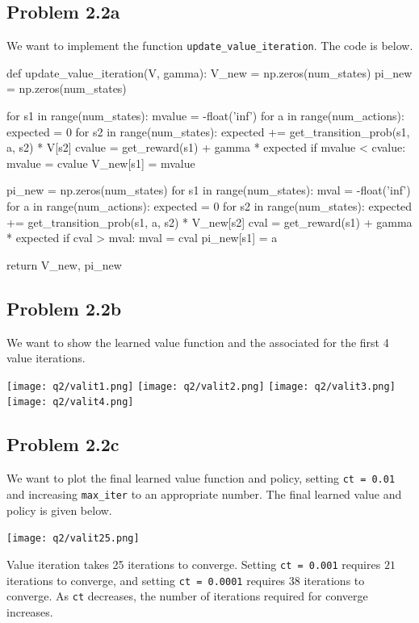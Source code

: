 \documentclass[submit]{harvardml}
\begin{document}
\subsection*{Problem 2.2a}
We want to implement the function \texttt{update\_value\_iteration}. The code is below.
\begin{python}
def update_value_iteration(V, gamma):
    V_new = np.zeros(num_states)
    pi_new = np.zeros(num_states)
    
    for s1 in range(num_states):
        mvalue = -float('inf')
        for a in range(num_actions):
            expected = 0
            for s2 in range(num_states):
                expected += get_transition_prob(s1, a, s2) * V[s2]
            cvalue = get_reward(s1) + gamma * expected
            if mvalue < cvalue:
                mvalue = cvalue
        V_new[s1] = mvalue

    pi_new = np.zeros(num_states)
    for s1 in range(num_states):
        mval = -float('inf')
        for a in range(num_actions):
            expected = 0 
            for s2 in range(num_states):
                expected += get_transition_prob(s1, a, s2) * V_new[s2]
            cval = get_reward(s1) + gamma * expected
            if cval > mval:
                mval = cval
                pi_new[s1] = a
    
    return V_new, pi_new
\end{python}

\subsection*{Problem 2.2b}
We want to show the learned value function and the associated for the first 4 value iterations.

\texttt{[image: q2/valit1.png]}
\texttt{[image: q2/valit2.png]}
\texttt{[image: q2/valit3.png]}
\texttt{[image: q2/valit4.png]}

\newpage
\subsection*{Problem 2.2c}
We want to plot the final learned value function and policy, setting \texttt{ct = 0.01} and increasing \texttt{max\_iter} to an appropriate number. The final learned value and policy is given below.

\texttt{[image: q2/valit25.png]}

Value iteration takes 25 iterations to converge. Setting \texttt{ct = 0.001} requires $21$ iterations to converge, and setting \texttt{ct = 0.0001} requires $38$ iterations to converge. As \texttt{ct} decreases, the number of iterations required for converge increases.
\end{document}
